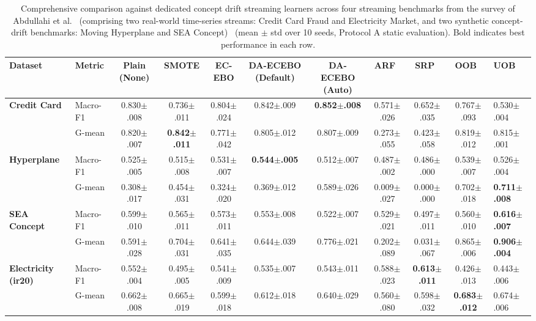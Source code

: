 \documentclass[preprint,10pt]{elsarticle}
\begin{document}
\begin{table}[!htbp]
\centering\footnotesize\setlength{\tabcolsep}{3.5pt}
\caption{Comprehensive comparison against dedicated concept drift streaming learners across four streaming benchmarks from the survey of Abdullahi et al.~\cite{abdullahi2025} (comprising two real-world time-series streams: Credit Card Fraud and Electricity Market, and two synthetic concept-drift benchmarks: Moving Hyperplane and SEA Concept)~\cite{abdullahi2025} (mean $\pm$ std over 10 seeds, Protocol A static evaluation). Bold indicates best performance in each row.}\label{tab:drift_comp}
\begin{tabular}{llcccccccc}
\toprule
Dataset & Metric & Plain (None) & SMOTE & EC-EBO & \textbf{DA-ECEBO (Default)} & \textbf{DA-ECEBO (Auto)} & ARF~\cite{gomes2017} & SRP~\cite{gomes2019} & OOB~\cite{wang2015} & UOB~\cite{wang2015}\\
\midrule
\textbf{Credit Card} & Macro-F1 & 0.830$\pm$.008 & 0.736$\pm$.011 & 0.804$\pm$.024 & 0.842$\pm$.009 & \textbf{0.852$\pm$.008} & 0.571$\pm$.026 & 0.652$\pm$.035 & 0.767$\pm$.093 & 0.530$\pm$.004\\
& G-mean & 0.820$\pm$.007 & \textbf{0.842$\pm$.011} & 0.771$\pm$.042 & 0.805$\pm$.012 & 0.807$\pm$.009 & 0.273$\pm$.055 & 0.423$\pm$.058 & 0.819$\pm$.012 & 0.815$\pm$.001\\
\midrule
\textbf{Hyperplane} & Macro-F1 & 0.525$\pm$.005 & 0.515$\pm$.008 & 0.531$\pm$.007 & \textbf{0.544$\pm$.005} & 0.512$\pm$.007 & 0.487$\pm$.002 & 0.486$\pm$.000 & 0.539$\pm$.007 & 0.526$\pm$.004\\
& G-mean & 0.308$\pm$.017 & 0.454$\pm$.031 & 0.324$\pm$.020 & 0.369$\pm$.012 & 0.589$\pm$.026 & 0.009$\pm$.027 & 0.000$\pm$.000 & 0.702$\pm$.018 & \textbf{0.711$\pm$.008}\\
\midrule
\textbf{SEA Concept} & Macro-F1 & 0.599$\pm$.010 & 0.565$\pm$.011 & 0.573$\pm$.011 & 0.553$\pm$.008 & 0.522$\pm$.007 & 0.529$\pm$.021 & 0.497$\pm$.011 & 0.560$\pm$.010 & \textbf{0.616$\pm$.007}\\
& G-mean & 0.591$\pm$.028 & 0.704$\pm$.031 & 0.641$\pm$.035 & 0.644$\pm$.039 & 0.776$\pm$.021 & 0.202$\pm$.089 & 0.031$\pm$.067 & 0.865$\pm$.006 & \textbf{0.906$\pm$.004}\\
\midrule
\textbf{Electricity (ir20)} & Macro-F1 & 0.552$\pm$.004 & 0.495$\pm$.005 & 0.541$\pm$.009 & 0.535$\pm$.007 & 0.543$\pm$.011 & 0.588$\pm$.023 & \textbf{0.613$\pm$.011} & 0.426$\pm$.013 & 0.443$\pm$.006\\
& G-mean & 0.662$\pm$.008 & 0.665$\pm$.019 & 0.599$\pm$.018 & 0.612$\pm$.018 & 0.640$\pm$.029 & 0.560$\pm$.080 & 0.598$\pm$.032 & \textbf{0.683$\pm$.012} & 0.674$\pm$.006\\
\bottomrule
\end{tabular}
\end{table}
\end{document}
